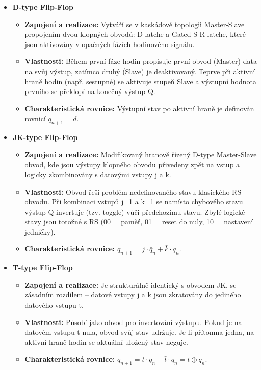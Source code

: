         \begin{itemize}
            \item \textbf{D-type Flip-Flop}
            \begin{itemize}
                \item \textbf{Zapojení a realizace:} Vytváří se v kaskádové topologii Master-Slave propojením dvou klopných obvodů: D latche a Gated S-R latche, které jsou aktivovány v opačných fázích hodinového signálu.
                \item \textbf{Vlastnosti:} Během první fáze hodin propisuje první obvod (Master) data na svůj výstup, zatímco druhý (Slave) je deaktivovaný. Teprve při aktivní hraně hodin (např. sestupné) se aktivuje stupeň Slave a výstupní hodnota prvního se překlopí na konečný výstup Q.
                \item \textbf{Charakteristická rovnice:} Výstupní stav po aktivní hraně je definován rovnicí $q_{n+1} = d$.
            \end{itemize}
        
            \item \textbf{JK-type Flip-Flop}
            \begin{itemize}
                \item \textbf{Zapojení a realizace:} Modifikovaný hranově řízený D-type Master-Slave obvod, kde jsou výstupy klopného obvodu přivedeny zpět na vstup a logicky zkombinovány s datovými vstupy j a k.
                \item \textbf{Vlastnosti:} Obvod řeší problém nedefinovaného stavu klasického RS obvodu. Při kombinaci vstupů j=1 a k=1 se namísto chybového stavu výstup Q invertuje (tzv. toggle) vůči předchozímu stavu. Zbylé logické stavy jsou totožné s RS (00 = paměť, 01 = reset do nuly, 10 = nastavení jedničky).
                \item \textbf{Charakteristická rovnice:} $q_{n+1} = j \cdot \bar{q}_n + \bar{k} \cdot q_n$.
            \end{itemize}
        
            \item \textbf{T-type Flip-Flop}
            \begin{itemize}
                \item \textbf{Zapojení a realizace:} Je strukturálně identický s obvodem JK, se zásadním rozdílem – datové vstupy j a k jsou zkratovány do jediného datového vstupu t.
                \item \textbf{Vlastnosti:} Působí jako obvod pro invertování výstupu. Pokud je na datovém vstupu t nula, obvod svůj stav udržuje. Je-li přítomna jedna, na aktivní hraně hodin se aktuální uložený stav neguje.
                \item \textbf{Charakteristická rovnice:} $q_{n+1} = t \cdot \bar{q}_n + \bar{t} \cdot q_n = t \oplus q_n$.
            \end{itemize}
        \end{itemize}
